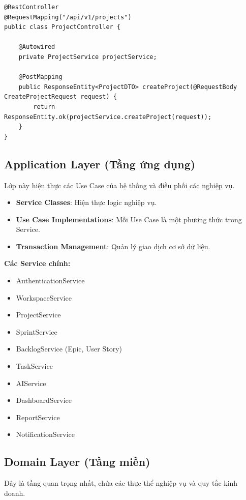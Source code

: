 \documentclass[12pt,a4paper]{report}
\begin{document}
\begin{verbatim}
@RestController
@RequestMapping("/api/v1/projects")
public class ProjectController {

    @Autowired
    private ProjectService projectService;

    @PostMapping
    public ResponseEntity<ProjectDTO> createProject(@RequestBody CreateProjectRequest request) {
        return ResponseEntity.ok(projectService.createProject(request));
    }
}
\end{verbatim}

\subsection{Application Layer (Tầng ứng dụng)}

Lớp này hiện thực các Use Case của hệ thống và điều phối các nghiệp vụ.

\begin{itemize}
\item \textbf{Service Classes}: Hiện thực logic nghiệp vụ.
\item \textbf{Use Case Implementations}: Mỗi Use Case là một phương thức trong Service.
\item \textbf{Transaction Management}: Quản lý giao dịch cơ sở dữ liệu.
\end{itemize}

\textbf{Các Service chính:}

\begin{itemize}
\item AuthenticationService
\item WorkspaceService
\item ProjectService
\item SprintService
\item BacklogService (Epic, User Story)
\item TaskService
\item AIService
\item DashboardService
\item ReportService
\item NotificationService
\end{itemize}

\subsection{Domain Layer (Tầng miền)}

Đây là tầng quan trọng nhất, chứa các thực thể nghiệp vụ và quy tắc kinh doanh.
\end{document}
